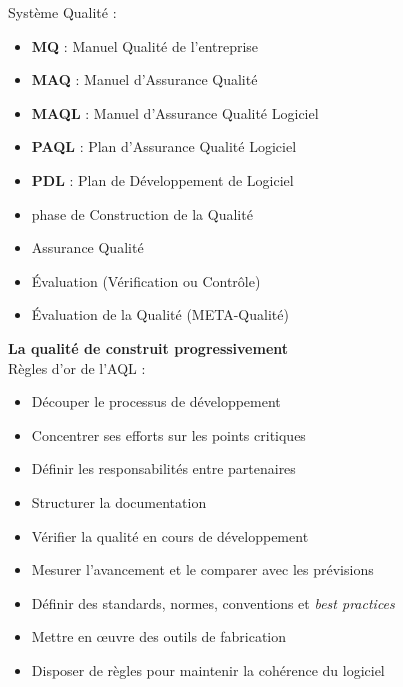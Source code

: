Système Qualité :
\begin{itemize}
\item \textbf{MQ} : Manuel Qualité de l’entreprise
\item \textbf{MAQ} : Manuel d’Assurance Qualité  
\item \textbf{MAQL} : Manuel d'Assurance Qualité Logiciel
\item \textbf{PAQL} : Plan d’Assurance Qualité Logiciel
\item \textbf{PDL} : Plan de Développement de Logiciel 
\item phase de Construction de la Qualité
\item Assurance Qualité
\item Évaluation (Vérification ou Contrôle)
\item Évaluation de la Qualité (META-Qualité)
\end{itemize}

\textbf{La qualité de construit progressivement}\hfill\\

Règles d’or de l’AQL :
\begin{itemize}
\item Découper le processus de développement
\item Concentrer ses efforts sur les points critiques
\item Définir les responsabilités entre partenaires
\item Structurer la documentation
\item Vérifier la qualité en cours de développement
\item Mesurer l’avancement et le comparer avec les prévisions
\item Définir des standards, normes, conventions et \textsl{best practices}
\item Mettre en \oe{}uvre des outils de fabrication
\item Disposer de règles pour maintenir la cohérence du logiciel
\end{itemize}

